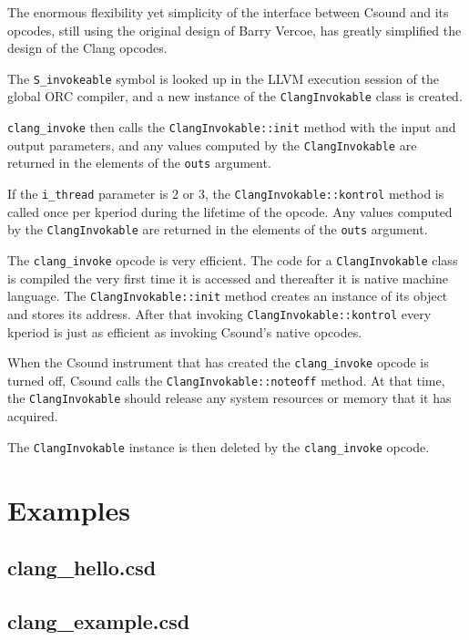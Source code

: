 \documentclass[letterpaper, 12pt]{article}
\begin{document}
\noindent The enormous flexibility yet simplicity of the interface between Csound and its opcodes, still using the original design of Barry Vercoe, has greatly simplified the design of the Clang opcodes.

The \verb|S_invokeable| symbol is looked up in the LLVM execution session 
of the global ORC compiler, and a new instance of the \verb|ClangInvokable| class 
is created. 

\verb|clang_invoke| then calls the \verb|ClangInvokable::init| method with 
the input and output parameters, and any values computed by the 
\verb|ClangInvokable| are returned in the elements of the \verb|outs| argument.

If the \verb|i_thread| parameter is 2 or 3, the \verb|ClangInvokable::kontrol| method is 
called once per kperiod during the lifetime of the opcode. Any values 
computed by the \verb|ClangInvokable| are returned in the elements of the \verb|outs| argument. 

The \verb|clang_invoke| opcode is very efficient. The code for a \verb|ClangInvokable| class is compiled the very first time it is accessed and thereafter it is native machine language. The \verb|ClangInvokable::init| method creates an instance of its object and stores its address. After that invoking \verb|ClangInvokable::kontrol| every kperiod is just as efficient as invoking Csound's native opcodes.

When the Csound instrument that has created the \verb|clang_invoke| opcode is 
turned off, Csound calls the \verb|ClangInvokable::noteoff| method. At that 
time, the \verb|ClangInvokable| should release any system resources or memory 
that it has acquired.

The \verb|ClangInvokable| instance is then deleted by the \verb|clang_invoke| opcode.

\section{Examples}

\subsection{clang\_hello.csd}

\subsection{clang\_example.csd}



\end{document}
